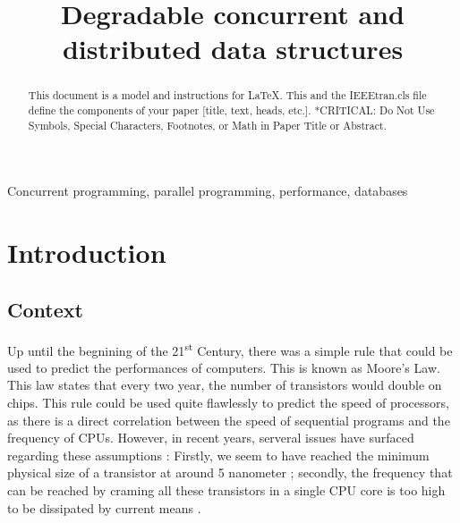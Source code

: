 \documentclass[conference]{IEEEtran}
\begin{document}
\title{Degradable concurrent and distributed data structures}

\author{
\and
{}
}

\maketitle

\begin{abstract}
This document is a model and instructions for \LaTeX.
This and the IEEEtran.cls file define the components of your paper [title, text, heads, etc.]. *CRITICAL: Do Not Use Symbols, Special Characters, Footnotes, 
or Math in Paper Title or Abstract.
\end{abstract}

\begin{IEEEkeywords}
Concurrent programming, parallel programming, performance, databases
\end{IEEEkeywords}

\section{Introduction}

\subsection{Context}
Up until the begnining of the 21\textsuperscript{st} Century, there was a simple rule that could be used to predict the performances of computers. This is known as Moore's Law. This law states that every two year, the number of transistors would double on chips. This rule could be used quite flawlessly to predict the speed of processors, as there is a direct correlation between the speed of sequential programs and the frequency of CPUs. However, in recent years, serveral issues have surfaced regarding these assumptions : Firstly, we seem to have reached the minimum physical size of a transistor at around 5 nanometer ; secondly, the frequency that can be reached by craming all these transistors in a single CPU core is too high to be dissipated by current means \cite{moore}. 
\end{document}
